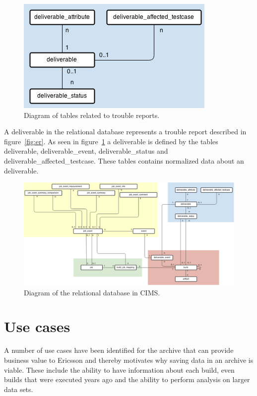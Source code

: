 \begin{figure}[h!]
\centering
\includegraphics[scale=0.5]{figure/deliverable.jpg}
\caption{Diagram of tables related to trouble reports.}
\label{fig:deliverable}
\end{figure}
A deliverable in the relational database represents a trouble report described in figure~\ref{fig:er}. As seen in figure~\ref{fig:deliverable} a deliverable is defined by the tables deliverable, deliverable\_event, deliverable\_status and deliverable\_affected\_testcase. These tables contains normalized data about an deliverable. 


\begin{figure}[h!]
\centering
\includegraphics[scale=0.5, angle=90]{figure/sql.png}
\caption{Diagram of the relational database in CIMS.}
\label{fig:sql}
\end{figure}


\section{Use cases}
\label{sec:usecases}
A number of use cases have been identified for the archive that can provide business value to Ericsson and thereby motivates why saving data in an archive is viable. These include the ability to have information about each build, even builds that were executed years ago and the ability to perform analysis on larger data sets. 

